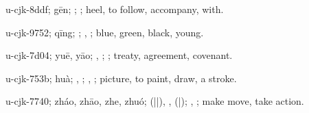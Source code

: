 \begin{multicols}{2}
{\cjkgGlue{}u-cjk-8ddf; gēn; \cjkgGlue{}\cjkgGlue{}\cjkgGlue{}; \cjkgGlue{}; heel, to follow, accompany, with.

\cjkgGlue{}u-cjk-9752; qīng; \cjkgGlue{}\cjkgGlue{}\cjkgGlue{}; \cjkgGlue{}, \cjkgGlue{}; blue, green, black, young.

\cjkgGlue{}u-cjk-7d04; yuē, yāo; \cjkgGlue{}, \cjkgGlue{}; \cjkgGlue{}; treaty, agreement, covenant.

\cjkgGlue{}u-cjk-753b; huà; \cjkgGlue{}, \cjkgGlue{}\cjkgGlue{}\cjkgGlue{}; \cjkgGlue{}, \cjkgGlue{}; picture, to paint, draw, a stroke.

\cjkgGlue{}u-cjk-7740; zháo, zhāo, zhe, zhuó; \cjkgGlue{}\cjkgGlue{}(\cjkgGlue{}|\cjkgGlue{}|\cjkgGlue{}), \cjkgGlue{}, \cjkgGlue{}\cjkgGlue{}(\cjkgGlue{}|\cjkgGlue{}); \cjkgGlue{}, \cjkgGlue{}; make move, take action.

}
\end{multicols}
